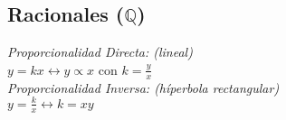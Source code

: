 \subsection{Racionales ($\mathbb{Q}$)}
\textit{Proporcionalidad Directa: (lineal)}\\
$ y = kx \leftrightarrow y \propto x $ con $k = \frac{y}{x}$\\

\textit{Proporcionalidad Inversa: (híperbola rectangular)}\\
$ y = \frac{k}{x} \leftrightarrow k = xy$\\